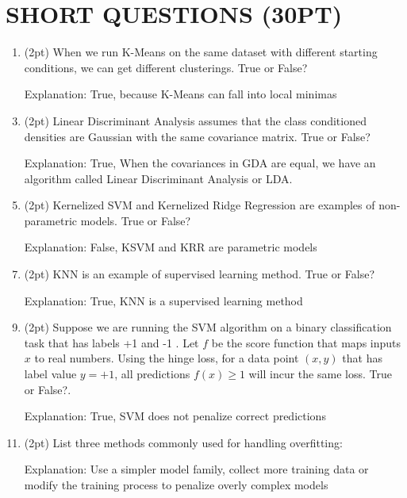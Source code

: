\documentclass[10pt, a4paper]{article}
\begin{document}
\section{SHORT QUESTIONS (30PT)}
\begin{enumerate}[label=(\alph*)]
    \item (2pt) When we run K-Means on the same dataset with different starting conditions, we can get different clusterings. True or False?

    \item[Explanation:] True, because K-Means can fall into local minimas

    \item (2pt) Linear Discriminant Analysis assumes that the class conditioned densities are Gaussian with the same covariance matrix. True or False?

    \item[Explanation:] True, When the covariances in GDA are equal, we have an algorithm called Linear Discriminant Analysis or LDA.

    \item (2pt) Kernelized SVM and Kernelized Ridge Regression are examples of non-parametric models. True or False?

    \item[Explanation:] False, KSVM and KRR are parametric models

    \item (2pt) KNN is an example of supervised learning method. True or False?

    \item[Explanation:] True, KNN is a supervised learning method

    \item (2pt) Suppose we are running the SVM algorithm on a binary classification task that has labels +1 and -1 . Let $f$ be the score function that maps inputs $x$ to real numbers. Using the hinge loss, for a data point $(x, y)$ that has label value $y=+1$, all predictions $f(x) \geq 1$ will incur the same loss. True or False?.

    \item[Explanation:] True, SVM does not penalize correct predictions

    \item (2pt) List three methods commonly used for handling overfitting:

    \item[Explanation:] Use a simpler model family, collect more training data or modify the training process to penalize overly complex models


\end{enumerate}
\end{document}
